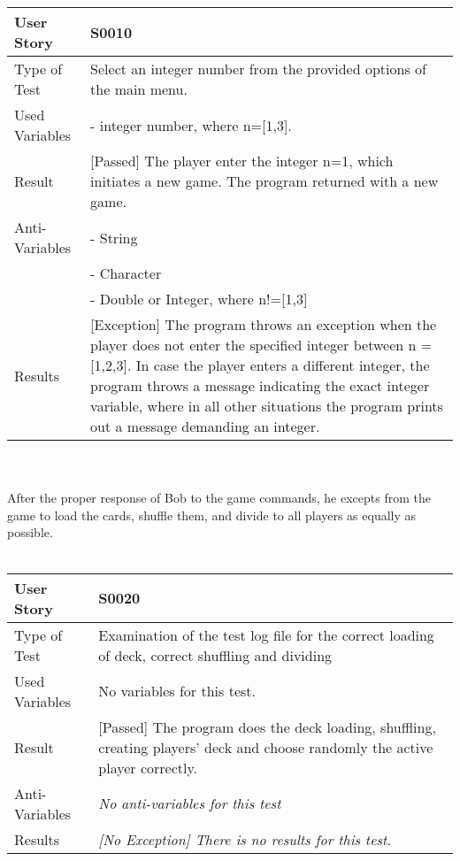\begin{tabular}{l | p{12cm}}
User Story & \textbf{S0010}\\ \hline
Type of Test & Select an integer number from the provided options of the main menu.\\ \hline
Used Variables & - integer number, where n=[1,3].\\ \hline
Result & [Passed] The player enter the integer n=1, which initiates a new game. The program returned with a new game.\\ \hline
Anti-Variables & - String\\
& - Character\\
& - Double or Integer, where n!=[1,3]\\
\hline
Results & [Exception] The program throws an exception when the player does not enter the specified integer between n = [1,2,3]. In case the player enters a different integer, the program throws a message indicating the exact integer variable, where in all other situations the program prints out a message demanding an integer.\\ \hline 
\end{tabular}\\
\vspace{0.2cm}\\
After the proper response of Bob to the game commands, he excepts from the game to load the cards, shuffle them, and divide to all players as equally as possible.\\
\vspace{0.2cm}\\
\begin{tabular}{l | p{12cm}}
User Story & \textbf{S0020}\\ \hline
Type of Test & Examination of the test log file for the correct loading of deck, correct shuffling and dividing\\ \hline
Used Variables & No variables for this test.\\ \hline
Result & [Passed] The program does the deck loading, shuffling, creating players' deck and choose randomly the active player correctly. \\ \hline
Anti-Variables & \textit{No anti-variables for this test} \\ \hline
Results & \textit{[No Exception] There is no results for this test.} \\ \hline
\end{tabular}\\
\vspace{0.2cm}\\
